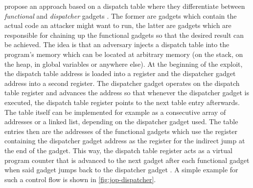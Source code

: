 \citeauthor{Bletsch2011} propose an approach based on a dispatch table where they differentiate between \emph{functional} and \emph{dispatcher} gadgets \cite{Bletsch2011}.
The former are gadgets which contain the actual code an attacker might want to run, the latter are gadgets which are responsible for chaining up the functional gadgets so that the desired result can be achieved.
The idea is that an adversary injects a dispatch table into the program's memory which can be located at arbitrary memory (on the stack, on the heap, in global variables or anywhere else).
At the beginning of the exploit, the dispatch table address is loaded into a register and the dispatcher gadget address into a second register.
The dispatcher gadget operates on the dispatch table register and advances the address so that whenever the dispatcher gadget is executed, the dispatch table register points to the next table entry afterwards.
The table itself can be implemented for example as a consecutive array of addresses or a linked list, depending on the dispatcher gadget used.
The table entries then are the addresses of the functional gadgets which use the register containing the dispatcher gadget address as the register for the indirect jump at the end of the gadget.
This way, the dispatch table register acts as a virtual program counter that is advanced to the next gadget after each functional gadget when said gadget jumps back to the dispatcher gadget \cite{Bletsch2011}.
A simple example for such a control flow is shown in \cref{fig:jop-dispatcher}.


